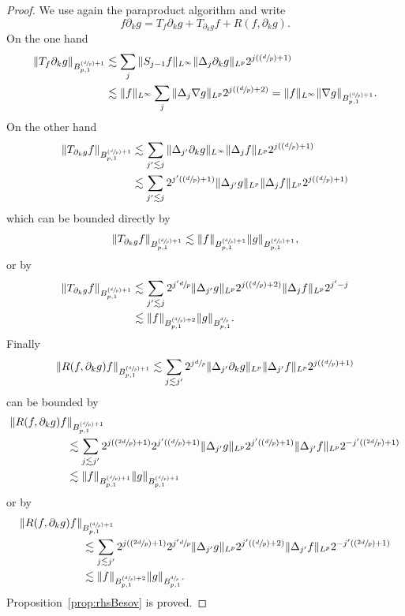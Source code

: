 \documentclass[JEP,XML,SOM,Unicode,published]{cedram}
\newcommand{\Psfrac}[2]{(\sfrac{#1}{#2})}
\theoremstyle{definition}
\begin{document}
\begin{proof}
We use again the paraproduct algorithm and write
\[
f \partial_k g = T_f \partial_k g + T_{\partial_k g }f + R(f,\partial_k g).
\]
On the one hand
\[
\begin{aligned}
\|T_f \partial_k g\|_{ B^{\Psfrac dp+1}_{p,1}} &\lesssim \sum_j \|S_{j-1}f\|_{L^\infty } \|\Delta_j \partial_k g\|_{ L^p}2^{j (\Psfrac dp+1)}\\
&\lesssim\| f\|_{L^\infty } \sum_j \|\Delta_j \nabla g\|_{L^p}2^{j (\Psfrac dp+2)} = \|f\|_{L^\infty} \|\nabla g\|_{ B^{\Psfrac dp+1	}_{p,1}}.
\end{aligned}
\]
On the other hand
\[
\begin{aligned}
\|T_{ \partial_k g} f \|_{ B^{\Psfrac dp+1}_{p,1}} &\lesssim \sum_{j'\lesssim j } \|\Delta_{j'} \partial_k g\|_{L^\infty }\|\Delta_j f\|_{L^p } 2^{j (\Psfrac dp+1)}\\
&\lesssim\sum_{j'\lesssim j }2^{j'(\Psfrac dp+1)} \|\Delta_{j'} g\|_{ L^p} \|\Delta_j f\|_{ L^p }2^{j (\Psfrac dp+1)}
\end{aligned}
\]
which can be bounded directly by
\[
\|T_{ \partial_k g} f \|_{ B^{\Psfrac dp+1}_{p,1}}\lesssim \| f\|_{B^{\Psfrac dp+1}_{p,1}} \|g\|_{B^{\Psfrac dp+1}_{p,1}},
\]
or by
\[
\begin{aligned}
\|T_{ \partial_k g} f \|_{ B^{\Psfrac dp+1}_{p,1}} &\lesssim
\sum_{j'\lesssim j } 2^{j'\sfrac dp} \|\Delta_{j'} g\|_{ L^p} 2^{j (\Psfrac dp+2)} \|\Delta_j f\|_{ L^p }2^{j'-j} \\
&\lesssim\| f\|_{B^{\Psfrac dp+2}_{p,1}} \|g\|_{ B^{\sfrac dp}_{p,1}}.
\end{aligned}
\]
Finally
\[
\|R(f,\partial_k g) f \|_{ B^{\Psfrac dp+1}_{p,1}} \lesssim
\sum_{j\lesssim j'} 2^{j \sfrac dp } \|\Delta_{j'} \partial_k g \|_{ L^p} \|\Delta_{j'} f\|_{ L^p }2^{j (\Psfrac dp+1)}
\]
can be bounded by
\[
\begin{aligned}
\|R(f,\partial_k g) f &\|_{ B^{\Psfrac dp+1}_{p,1}}\\
&\lesssim \sum_{j\lesssim j'} 2^{j (\Psfrac {2d}p+1) } 2^{j' (\Psfrac dp+1) } \|\Delta_{j'} g \|_{ L^p} 2^{j' (\Psfrac dp+1) }\|\Delta_{j'} f\|_{L^p } 2^{-j'(\Psfrac {2d}p+1)}\\
&\lesssim\| f\|_{B^{\Psfrac dp+1}_{p,1}} \|g\|_{ B^{\Psfrac dp+1}_{p,1}}
\end{aligned}
\]
or by
\[
\begin{aligned}
\|R(f,\partial_k g) f \|&_{ B^{\Psfrac dp+1}_{p,1}}\\
&\lesssim \sum_{j\lesssim j'} 2^{j (\Psfrac {2d}p+1) } 2^{j' \sfrac dp } \|\Delta_{j'} g \|_{ L^p} 2^{j' (\Psfrac dp+2) }\|\Delta_{j'} f\|_{L^p } 2^{-j'(\Psfrac {2d}p+1)}\\
&\lesssim\| f\|_{B^{\Psfrac dp+2}_{p,1}} \|g\|_{ B^{\sfrac dp}_{p,1}}.\end{aligned}
\]
Proposition~\ref{prop:rhsBesov} is proved.
\end{proof}
\end{document}
